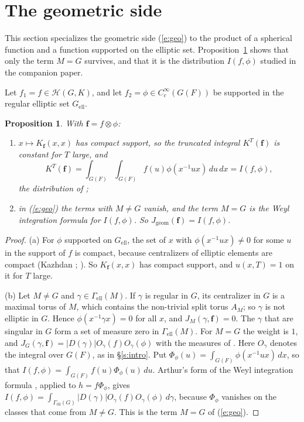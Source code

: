 \documentclass[12pt,letterpaper]{article}
\numberwithin{equation}{section}
\theoremstyle{plain}
\newtheorem{proposition}[theorem]{Proposition}
\theoremstyle{definition}
\theoremstyle{remark}
\newcommand{\Hc}{\mathcal{H}}
\newcommand{\ellr}{\mathrm{ell}}
\begin{document}
\section{The geometric side}\label{s:geom}

This section specializes the geometric side (\ref{e:geo}) to the product of a spherical function and a function supported on the elliptic set. Proposition~\ref{p:geom} shows that only the term $M=G$ survives, and that it is the distribution $I(f,\phi)$ studied in the companion paper.

Let $f_1=f\in\Hc(G,K)$, and let $f_2=\phi\in C_c^\infty(G(F))$ be supported in the regular elliptic set $G_{\ellr}$.

\begin{proposition}\label{p:geom}
With $\mathbf f=f\otimes\phi$:
\begin{enumerate}[label=(\alph*)]
\item $x\mapsto K_{\mathbf f}(x,x)$ has compact support, so the truncated integral $K^T(\mathbf f)$ is constant for $T$ large, and
\[
K^T(\mathbf f)=\int_{G(F)}\int_{G(F)}f(u)\phi(x^{-1}ux)\,du\,dx=I(f,\phi),
\]
the distribution of \cite[(1.1), (4.8)]{JC26};
\item in (\ref{e:geo}) the terms with $M\ne G$ vanish, and the term $M=G$ is the Weyl integration formula for $I(f,\phi)$. So $J_{\mathrm{geom}}(\mathbf f)=I(f,\phi)$.
\end{enumerate}
\end{proposition}

\begin{proof}
(a) For $\phi$ supported on $G_{\ellr}$, the set of $x$ with $\phi(x^{-1}ux)\ne0$ for some $u$ in the support of $f$ is compact, because centralizers of elliptic elements are compact (Kazhdan \cite[\S4]{Ka86}; \cite[Lemma~4.4]{JC26}). So $K_{\mathbf f}(x,x)$ has compact support, and $u(x,T)=1$ on it for $T$ large.

(b) Let $M\ne G$ and $\gamma\in\Gamma_{\ellr}(M)$. If $\gamma$ is regular in $G$, its centralizer in $G$ is a maximal torus of $M$, which contains the non-trivial split torus $A_M$; so $\gamma$ is not elliptic in $G$. Hence $\phi(x^{-1}\gamma x)=0$ for all $x$, and $J_M(\gamma,\mathbf f)=0$. The $\gamma$ that are singular in $G$ form a set of measure zero in $\Gamma_{\ellr}(M)$. For $M=G$ the weight is $1$, and $J_G(\gamma,\mathbf f)=|D(\gamma)|O_\gamma(f)O_\gamma(\phi)$ with the measures of \cite[(4.10)]{JC26}. Here $O_\gamma$ denotes the integral over $G(F)$, as in \S\ref{s:intro}. Put $\Phi_\phi(u)=\int_{G(F)}\phi(x^{-1}ux)\,dx$, so that $I(f,\phi)=\int_{G(F)}f(u)\Phi_\phi(u)\,du$. Arthur's form of the Weyl integration formula \cite[(2.2)]{Ar91}, applied to $h=f\Phi_\phi$, gives $I(f,\phi)=\int_{\Gamma_{\ellr}(G)}|D(\gamma)|O_\gamma(f)O_\gamma(\phi)\,d\gamma$, because $\Phi_\phi$ vanishes on the classes that come from $M\ne G$. This is the term $M=G$ of (\ref{e:geo}).
\end{proof}
\end{document}
